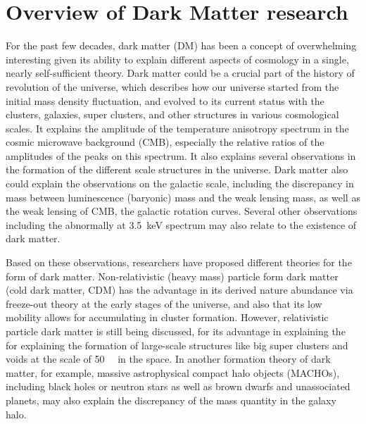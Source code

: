 \chapter{Overview of Dark Matter research}
\label{chap:introDM}
For the past few decades, dark matter (DM) has been a concept of overwhelming interesting  given its ability to explain different aspects of cosmology in a single, nearly self-sufficient theory. %
Dark matter could be a crucial part of the history of revolution of the universe, which describes how our universe started from the initial mass density fluctuation, and evolved to its current status with the clusters, galaxies, super clusters, and other structures in various cosmological scales. %
It explains the amplitude of the temperature anisotropy spectrum in the cosmic microwave background (CMB), especially  the relative ratios of the amplitudes of the peaks on this spectrum.  It also explains several observations in the formation of the different scale structures in the universe. Dark matter also could explain the observations on the galactic scale, including the discrepancy in mass between luminescence (baryonic) mass and the weak lensing mass, as well as the weak lensing of CMB, the galactic rotation curves. Several other observations including the abnormally at \SI{3.5}{\keV} spectrum may also relate to the existence of dark matter. %

Based on these observations, researchers have proposed different theories for the form of dark matter. Non-relativistic (heavy mass) particle form dark matter (cold dark matter, CDM) has the advantage in its derived nature abundance via freeze-out theory at the early stages of the universe, and also that its low mobility allows for accumulating in cluster formation. However, relativistic particle dark matter is still being discussed, for its advantage in explaining the for explaining the formation of large-scale structures like big super clusters and voids at the scale of \SI{50}{\mega\parsec} in the space. In another formation theory of dark matter, for example, massive astrophysical compact halo objects (MACHOs), including black holes or neutron stars as well as brown dwarfs and unassociated planets, may also explain the discrepancy of the mass quantity in the galaxy halo.    

